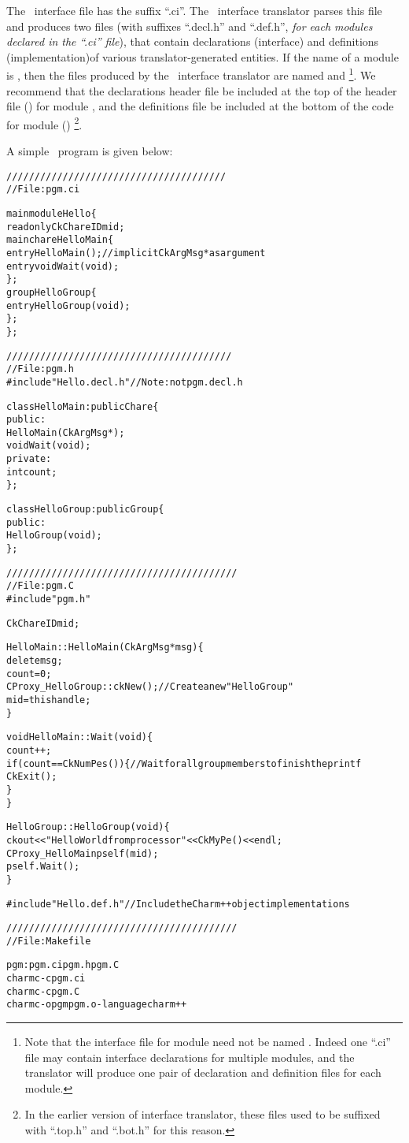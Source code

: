 The \charmpp\ interface file has the suffix ``.ci''.  The \charmpp\ interface
translator parses this file and produces two files (with suffixes ``.decl.h''
and ``.def.h'', {\em for each modules declared in the ``.ci'' file}), that
contain declarations (interface) and definitions (implementation)of various
translator-generated entities. If the name of a module is , then the
files produced by the \charmpp\ interface translator are named 
and \footnote{Note that the interface file for module 
need not be named . Indeed one ``.ci'' file may contain interface
declarations for multiple modules, and the translator will produce one pair of
declaration and definition files for each module.}.  We recommend that the
declarations header file be included at the top of the header file ()
for module , and the definitions file be included at the bottom of the
code for module () \footnote{In the earlier version of interface
translator, these files used to be suffixed with ``.top.h'' and ``.bot.h'' for
this reason.}.

A simple \charmpp\ program is given below:

\begin{alltt}
///////////////////////////////////////
// File: pgm.ci

mainmodule Hello \{
  readonly CkChareID mid;
  mainchare HelloMain \{
    entry HelloMain(); // implicit CkArgMsg * as argument
    entry void Wait(void);
  \};
  group HelloGroup \{
    entry HelloGroup(void);
  \};
\};

////////////////////////////////////////
// File: pgm.h
#include "Hello.decl.h" // Note: not pgm.decl.h

class HelloMain: public Chare \{
  public:
    HelloMain(CkArgMsg *);
    void Wait(void);
  private:
    int count;
\};

class HelloGroup: public Group \{
  public:
    HelloGroup(void);
\};

/////////////////////////////////////////
// File: pgm.C
#include "pgm.h"

CkChareID mid;

HelloMain::HelloMain(CkArgMsg *msg) \{
  delete msg;
  count = 0;
  CProxy_HelloGroup::ckNew(); // Create a new "HelloGroup"
  mid = thishandle;
\}

void HelloMain::Wait(void) \{
  count++;
  if (count == CkNumPes()) \{ // Wait for all group members to finish the printf
    CkExit();
  \}
\}

HelloGroup::HelloGroup(void) \{
  ckout << "Hello World from processor " << CkMyPe() << endl;
  CProxy_HelloMain pself(mid);
  pself.Wait();
\}

#include "Hello.def.h" // Include the Charm++ object implementations

/////////////////////////////////////////
// File: Makefile

pgm: pgm.ci pgm.h pgm.C
      charmc -c pgm.ci
      charmc -c pgm.C
      charmc -o pgm pgm.o -language charm++

\end{alltt}

